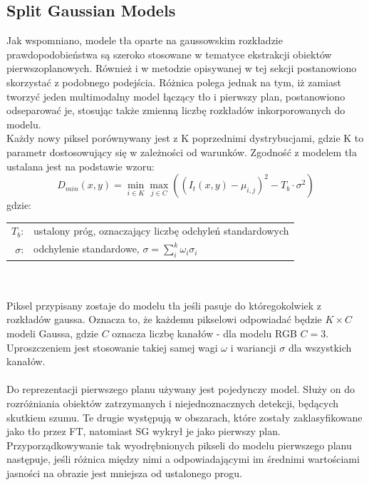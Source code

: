 \subsection{Split Gaussian Models}
\label{sec:SG}
Jak wspomniano, modele tła oparte na gaussowskim rozkładzie prawdopodobieństwa są szeroko stosowane w tematyce ekstrakcji obiektów pierwszoplanowych. Również i w metodzie opisywanej w tej sekcji postanowiono skorzystać z podobnego podejścia. Różnica polega jednak na tym, iż zamiast tworzyć jeden multimodalny model łączący tło i pierwszy plan, postanowiono odseparować je, stosując także zmienną liczbę rozkładów inkorporowanych do modelu.\\
Każdy nowy piksel porównywany jest z K poprzednimi dystrybucjami, gdzie K to parametr dostosowujący się w zależności od warunków. Zgodność z modelem tła ustalana jest na podstawie wzoru:
\begin{equation}
D_{min}(x,y) = \min_{i\in K}\max_{j\in C}((I_{t}(x,y)-\mu_{i,j})^2-T_{b}\cdot\sigma^2)
\end{equation}
gdzie:\\ 
\hspace*{3em}
\begin{tabular}{r p{}}
$T_{b}$: &  ustalony próg, oznaczający liczbę odchyleń standardowych\\
$\sigma$: & odchylenie standardowe, $\sigma = \sum_{i}^{k}\omega_{i}\sigma_{i}$
\end{tabular} 
~\\
~\\
Piksel przypisany zostaje do modelu tła jeśli pasuje do któregokolwiek z rozkładów gaussa. Oznacza to, że każdemu pikselowi odpowiadać będzie $K\times C$ modeli Gaussa, gdzie $C$ oznacza liczbę kanałów - dla modelu RGB $C = 3$. Uproszczeniem jest stosowanie takiej samej wagi $\omega$ i wariancji $\sigma$ dla wszystkich kanałów.
\paragraph{}
Do reprezentacji pierwszego planu używany jest pojedynczy model. Służy on do rozróżniania obiektów zatrzymanych i niejednoznacznych detekcji, będących skutkiem szumu. Te drugie występują w obszarach, które zostały zaklasyfikowane jako tło przez FT, natomiast SG wykrył je jako pierwszy plan. Przyporządkowywanie tak wyodrębnionych pikseli do modelu pierwszego planu następuje, jeśli różnica między nimi a odpowiadającymi im średnimi wartościami jasności na obrazie jest mniejsza od ustalonego progu.
